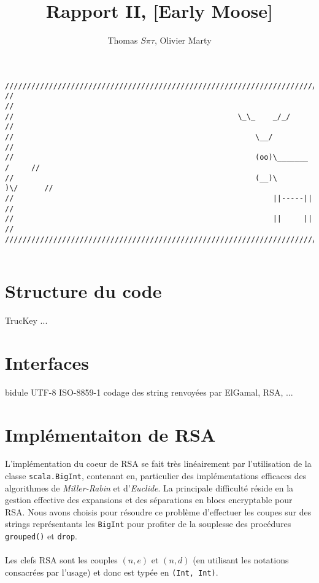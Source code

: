 \documentclass[11pt]{article} %
\title{Rapport II,  [Early Moose]}
\author{Thomas $S\pi\tau$, Olivier Marty}
\begin{document}
\maketitle

\begin{verbatim}
////////////////////////////////////////////////////////////////////////////////
//                                                                            //
//                                                   \_\_    _/_/             //
//                                                       \__/                 //
//                                                       (oo)\_______   /     //
//                                                       (__)\       )\/      //
//                                                           ||-----||        //
//                                                           ||     ||        //
////////////////////////////////////////////////////////////////////////////////  


\end{verbatim}


\section{Structure du code}
TrucKey ...

\section{Interfaces}
bidule UTF-8 ISO-8859-1
codage des string renvoyées par ElGamal, RSA, ...


\section{Implémentaiton de RSA}

L'implémentation du coeur de RSA se fait très linéairement par l'utilisation de la classe \texttt{scala.BigInt}, contenant en, particulier des implémentations efficaces des algorithmes de \emph{Miller-Rabin} et d'\emph{Euclide}. La principale difficulté réside en la gestion effective des expansions et des séparations en blocs encryptable pour RSA. Nous avons choisis pour résoudre ce problème d'effectuer les coupes sur des strings représentants les \texttt{BigInt} pour profiter de la souplesse des procédures \texttt{grouped()} et \texttt{drop}. \\\\
Les clefs RSA sont les couples $(n,e)$ et $(n,d)$ (en utilisant les notations consacrées par l'usage) et donc est typée en 
\texttt{(Int, Int)}. 
\end{document}
